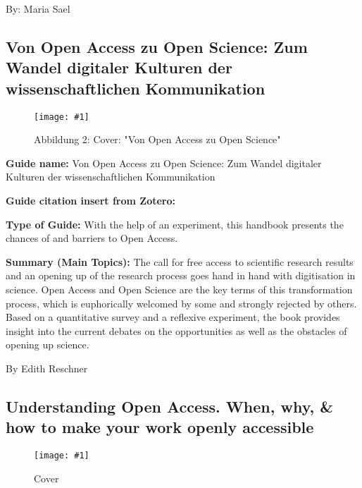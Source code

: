 \documentclass{article}
\newlength{\imgwidth}
\newcommand\scaledgraphics[2]{%
                
\settowidth{\imgwidth}{\texttt{[image: \#1]}}%
                
\setlength{\imgwidth}{\minof{\imgwidth}{#2\textwidth}}%
                
\texttt{[image: \#1]}%
                
}
\begin{document}
By: Maria Sael 





\subsection{Von Open Access zu Open Science: Zum Wandel digitaler Kulturen der wissenschaftlichen Kommunikation}\label{H9740541}



\begin{center}
\begin{figure}
\scaledgraphics{499c4719-8346-4a67-8a5b-fcacfb0ecde0.png}{0.5}
\caption*{Abbildung 2: Cover: "Von Open Access zu Open Science"}\label{F14991031}
\end{figure}


\end{center}





\textbf{Guide name:} Von Open Access zu Open Science: Zum Wandel digitaler Kulturen der wissenschaftlichen Kommunikation


\textbf{Guide citation insert from Zotero:}  \autocite{heise_von_2018}


\textbf{Type of Guide: }With the help of an experiment, this handbook presents the chances of and barriers to Open Access.


\textbf{Summary (Main Topics): }The call for free access to scientific research results and an opening up of the research process goes hand in hand with digitisation in science. Open Access and Open Science are the key terms of this transformation process, which is euphorically welcomed by some and strongly rejected by others. Based on a quantitative survey and a reflexive experiment, the book provides insight into the current debates on the opportunities as well as the obstacles of opening up science.


By Edith Reschner 





\subsection{Understanding Open Access. When, why, \& how to make your work openly accessible}\label{H1144211}


\begin{figure}
\scaledgraphics{37cc2dfd-e350-4e29-acc3-9c7f815eb133.png}{0.5}
\caption*{Cover}\label{F36070241}
\end{figure}
\end{document}
